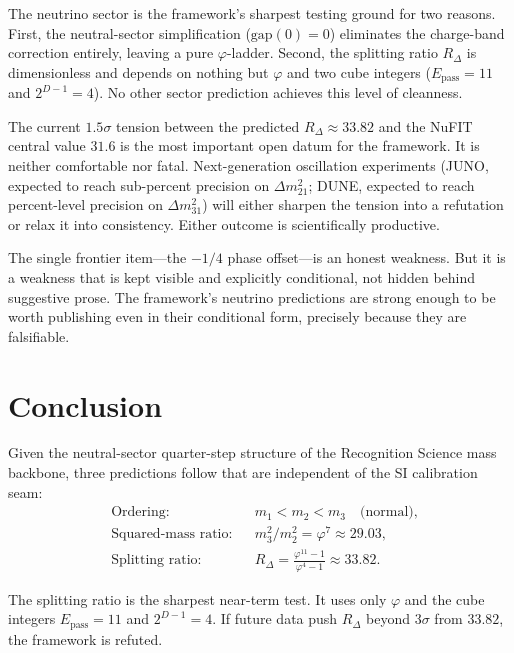 \documentclass[11pt]{article}
\theoremstyle{remark}
\newcommand{\phig}{\varphi}
\newcommand{\Epass}{E_{\mathrm{pass}}}
\newcommand{\Rdel}{R_\Delta}
\begin{document}
The neutrino sector is the framework's sharpest testing ground
for two reasons.  First, the neutral-sector simplification
($\mathrm{gap}(0)=0$) eliminates the charge-band correction
entirely, leaving a pure $\phig$-ladder.  Second, the
splitting ratio $\Rdel$ is dimensionless and depends on nothing
but $\phig$ and two cube integers ($\Epass=11$ and
$2^{D-1}=4$).  No other sector prediction achieves this level
of cleanness.

The current $1.5\sigma$ tension between the predicted
$\Rdel\approx 33.82$ and the NuFIT central value $31.6$ is
the most important open datum for the framework.  It is neither
comfortable nor fatal.  Next-generation oscillation experiments
(JUNO, expected to reach sub-percent precision on $\Delta m^2_{21}$;
DUNE, expected to reach percent-level precision on
$\Delta m^2_{31}$) will either sharpen the tension into a
refutation or relax it into consistency.  Either outcome is
scientifically productive.

The single frontier item---the $-1/4$ phase offset---is an
honest weakness.  But it is a weakness that is kept visible and
explicitly conditional, not hidden behind suggestive prose.
The framework's neutrino predictions are strong enough to be
worth publishing even in their conditional form, precisely
because they are falsifiable.

\section{Conclusion}

Given the neutral-sector quarter-step structure of the
Recognition Science mass backbone, three predictions follow
that are independent of the SI calibration seam:
\begin{align}
  &\text{Ordering:} &&m_1 < m_2 < m_3
    \quad\text{(normal)}, \label{eq:conc_ord} \\
  &\text{Squared-mass ratio:} &&m_3^2/m_2^2 = \phig^7
    \approx 29.03, \label{eq:conc_phi7} \\
  &\text{Splitting ratio:} &&\Rdel
    = \frac{\phig^{11}-1}{\phig^4-1}
    \approx 33.82. \label{eq:conc_split}
\end{align}

The splitting ratio is the sharpest near-term test.  It uses
only $\phig$ and the cube integers $\Epass=11$ and $2^{D-1}=4$.
If future data push $\Rdel$ beyond $3\sigma$ from $33.82$,
the framework is refuted.
\end{document}
